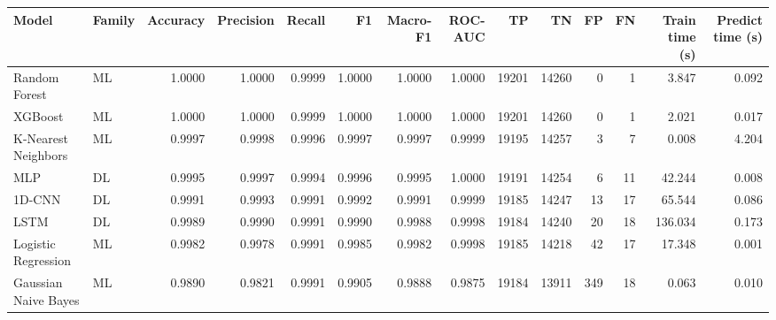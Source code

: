 \begin{tabular}{llrrrrrrrrrrrr}
\toprule
Model & Family & Accuracy & Precision & Recall & F1 & Macro-F1 & ROC-AUC & TP & TN & FP & FN & Train time (s) & Predict time (s) \\
\midrule
Random Forest & ML & 1.0000 & 1.0000 & 0.9999 & 1.0000 & 1.0000 & 1.0000 & 19201 & 14260 & 0 & 1 & 3.847 & 0.092 \\
XGBoost & ML & 1.0000 & 1.0000 & 0.9999 & 1.0000 & 1.0000 & 1.0000 & 19201 & 14260 & 0 & 1 & 2.021 & 0.017 \\
K-Nearest Neighbors & ML & 0.9997 & 0.9998 & 0.9996 & 0.9997 & 0.9997 & 0.9999 & 19195 & 14257 & 3 & 7 & 0.008 & 4.204 \\
MLP & DL & 0.9995 & 0.9997 & 0.9994 & 0.9996 & 0.9995 & 1.0000 & 19191 & 14254 & 6 & 11 & 42.244 & 0.008 \\
1D-CNN & DL & 0.9991 & 0.9993 & 0.9991 & 0.9992 & 0.9991 & 0.9999 & 19185 & 14247 & 13 & 17 & 65.544 & 0.086 \\
LSTM & DL & 0.9989 & 0.9990 & 0.9991 & 0.9990 & 0.9988 & 0.9998 & 19184 & 14240 & 20 & 18 & 136.034 & 0.173 \\
Logistic Regression & ML & 0.9982 & 0.9978 & 0.9991 & 0.9985 & 0.9982 & 0.9998 & 19185 & 14218 & 42 & 17 & 17.348 & 0.001 \\
Gaussian Naive Bayes & ML & 0.9890 & 0.9821 & 0.9991 & 0.9905 & 0.9888 & 0.9875 & 19184 & 13911 & 349 & 18 & 0.063 & 0.010 \\
\bottomrule
\end{tabular}
